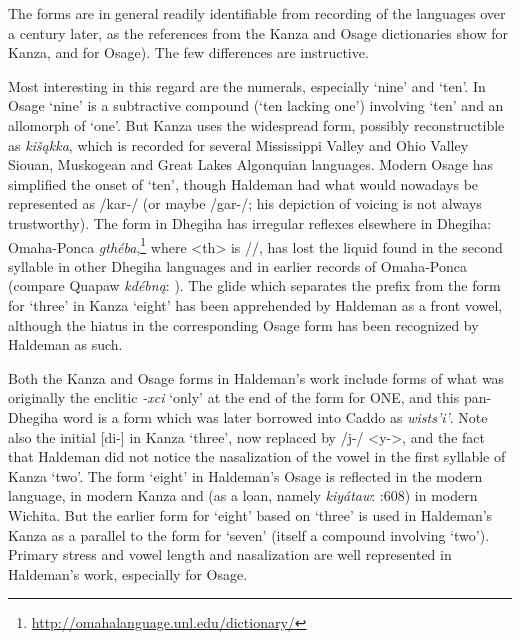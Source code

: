 \documentclass[output=paper]{LSP/langsci}
\begin{document}
The forms are in general readily identifiable from recording of the languages over a century later, as the references from the Kanza and Osage dictionaries show \citep{CumberlandRankin2012} for Kanza, and \citealt{Quintero2009} for Osage). The few differences are instructive.    

Most interesting in this regard are the numerals, especially `nine' and `ten'.  In Osage `nine' is a subtractive compound (`ten lacking one') involving `ten' and an allomorph of `one'.  But  Kanza uses the widespread form, possibly reconstructible as \textit{ki\v{s}\k{a}kka}, which is recorded for several Mississippi Valley and Ohio Valley Siouan, Muskogean and Great Lakes Algonquian languages.   Modern Osage has simplified the onset of `ten', though Haldeman had what would nowadays be represented as /kar-/ (or maybe /gar-/; his depiction of voicing is not always trustworthy).  The form in Dhegiha has irregular reflexes elsewhere in Dhegiha:   Omaha-Ponca \textit{gth\'eba},\footnote{\url{http://omahalanguage.unl.edu/dictionary/}} where <th> is //, has lost the liquid found in the second syllable in other Dhegiha languages and in earlier records of Omaha-Ponca (compare Quapaw \textit{kd\'ebn\k{a}}: \citealt[3]{Rankin1982}). The glide which separates the prefix from the form for `three' in Kanza `eight' has been apprehended by Haldeman as a front vowel, although the hiatus in the corresponding Osage form has been recognized by Haldeman as such.  

Both the Kanza and Osage forms in Haldeman's work include forms of what was originally the enclitic \textit{-xci} `only' at the end of the form for ONE, and this pan-Dhegiha word is a form which was later borrowed into Caddo as \textit{wists'i'}.  Note also the initial [di-] in Kanza `three', now replaced by /j-/ <y->, and the fact that Haldeman did not notice the nasalization of the vowel in the first syllable of Kanza `two'.  The form `eight' in Haldeman's Osage is reflected in the modern language, in modern Kanza and (as a loan, namely \textit{kiy\'ataw}: \citealt{Rood1996}:608) in modern Wichita. But the earlier form for `eight' based on `three' is used in Haldeman's Kanza as a parallel to the form for `seven' (itself a compound involving `two'). Primary stress and vowel length and nasalization are well represented in Haldeman's work, especially for Osage.  
\end{document}
